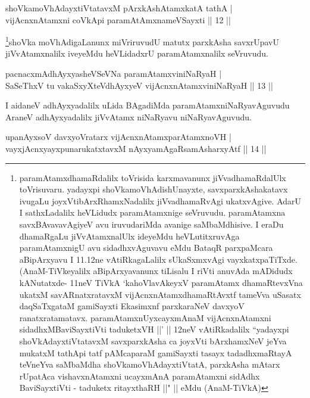 \begin{shl}
shoVkamoVhAdayxtiVtatavxM pArxkAshAtamxkatA tathA |\\
vijAcnxnAtamxni coVkA\s pi paramAtAmxnameVSayxti \hfill || 12 ||
\end{shl}

\begin{artha}
\footnote[2]{paramAtamxdhamaRdalilx toVrisida karxmavanunx jiVvadhamaRdalUlx toVrisuvaru. yadayxpi shoVkamoVhAdishUnayxte, savxparxkAshakatavx ivugaLu joyxVtibArxRhamxNadalilx jiVvadhamaRvAgi ukatxvAgive. AdarU I sathxLadalilx heVLidudx paramAtamxnige seVruvudu. paramAtamxna savxBAvavavAgiyeV avu iruvudariMda avanige saMbaMdhisive. I eraDu dhamaRgaLu jiVvAtamxnalUlx ideyeMdu heVLutitxruvAga paramAtamxnigU avu sidadhxvAguvavu eMdu BataqR parxpaMcara aBipArxyavu I 11.12ne vAtiRkagaLalilx sUkaSxmxvAgi vayxkatxpaTiTxde. (AnaM-TiVkeyalilx aBipArxyavanunx tiLisalu I riVti anuvAda mADidudx kANutatxde- 11neV TiVkA `kahoVlavAkeyxV paramAtamx dhamaRtevxVna ukatxM savARnatxratavxM vijAcnxnAtamxdhamaRtAvxtf tameVva uSasatx daqSaTxgataM gamiSayxti Ekasimxnf parxkaraNeV davxyoV  ranatxratamatavx. paramAtamxnUyxcayxmAnaM vijAcnxnAtamxni sidadhxMBaviSayxtiVti taduketxVH ||' || 12neV vAtiRkadalilx ``yadayxpi shoVkAdayxtiVtatavxM savxparxkAsha ca joyxVti bArxhamxNeV jeYva mukatxM tathApi tatf pAMcaparaM gamiSayxti tasayx tadadhxmaRtayA teVneYva saMbaMdha shoVkamoVhAdayxtiVtatA, parxkAsha mAtarx rUpatAca vishavxnAtamxni ucayxmAnA paramAtamxni sidAdhx BaviSayxtiVti - taduketx ritayxthaRH ||" || eMdu (AnaM-TiVkA)}shoVka moVhAdigaLanunx miVriruvudU matutx parxkAsha savxrUpavU jiVvAtamxnalilx iveyeMdu heVLidadxrU paramAtamxnalilx seVruvudu.
\end{artha}


\begin{shl}
pacnacxmAdhAyxyasheVSeVNa paramAtamxviniNaRyaH |\\
SaSeThxV tu vakaSxyXteV\s dhAyxyeV vijAcnxnAtamxviniNaRyaH \hfill || 13 ||
\end{shl}

\begin{artha}
I aidaneV adhAyxyadalilx uLida BAgadiMda paramAtamxniNaRyavAguvudu AraneV adhAyxyadalilx jiVvAtamx niNaRyavu niNaRyavAguvudu.
\end{artha}

\begin{shl}
upanAyxsoV davxyoVratarx vijAcnxnAtamxparAtamxnoVH |\\
vayxjAcnxyayxpunarukatxtavxM nAyxyamAgaRsamAsharxyAtf \hfill || 14 ||
\end{shl}

